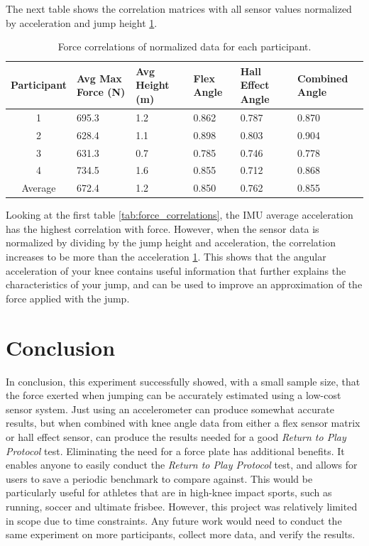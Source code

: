 \documentclass[manuscript,screen,review]{acmart}
\begin{document}
The next table shows the correlation matrices with all sensor values normalized by acceleration and jump height \ref{tab:force_correlations_normalized}.


\begin{table}[ht]
  \caption{Force correlations of normalized data for each participant.}
  \label{tab:force_correlations_normalized}
  \begin{tabular}{clllll}
    \toprule
    Participant & Avg Max Force (N) & Avg Height (m) & Flex Angle & Hall Effect Angle & Combined Angle \\
    \midrule
    1 & 695.3 & 1.2 & 0.862 & 0.787 & 0.870 \\
    2 & 628.4 & 1.1 & 0.898 & 0.803 & 0.904 \\
    3 & 631.3 & 0.7 & 0.785 & 0.746 & 0.778 \\
    4 & 734.5 & 1.6 & 0.855 & 0.712 & 0.868 \\
    Average & 672.4 & 1.2 & 0.850 & 0.762 & 0.855 \\
  \bottomrule
\end{tabular}
\end{table}

Looking at the first table \ref{tab:force_correlations}, the IMU average acceleration has the highest correlation with force. However, when the sensor data is normalized by dividing by the jump height and acceleration, the correlation increases to be more than the acceleration \ref{tab:force_correlations_normalized}. This shows that the angular acceleration of your knee contains useful information that further explains the characteristics of your jump, and can be used to improve an approximation of the force applied with the jump.

\section{Conclusion}

In conclusion, this experiment successfully showed, with a small sample size, that the force exerted when jumping can be accurately estimated using a low-cost sensor system. Just using an accelerometer can produce somewhat accurate results, but when combined with knee angle data from either a flex sensor matrix or hall effect sensor, can produce the results needed for a good \textit{Return to Play Protocol} test. Eliminating the need for a force plate has additional benefits. It enables anyone to easily conduct the \textit{Return to Play Protocol} test, and allows for users to save a periodic benchmark to compare against. This would be particularly useful for athletes that are in high-knee impact sports, such as running, soccer and ultimate frisbee. However, this project was relatively limited in scope due to time constraints. Any future work would need to conduct the same experiment on more participants, collect more data, and verify the results.
\end{document}
